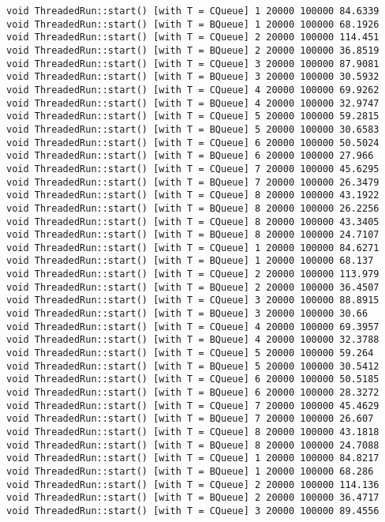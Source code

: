 \begin{verbatim}
void ThreadedRun::start() [with T = CQueue] 1 20000 100000 84.6339
void ThreadedRun::start() [with T = BQueue] 1 20000 100000 68.1926
void ThreadedRun::start() [with T = CQueue] 2 20000 100000 114.451
void ThreadedRun::start() [with T = BQueue] 2 20000 100000 36.8519
void ThreadedRun::start() [with T = CQueue] 3 20000 100000 87.9081
void ThreadedRun::start() [with T = BQueue] 3 20000 100000 30.5932
void ThreadedRun::start() [with T = CQueue] 4 20000 100000 69.9262
void ThreadedRun::start() [with T = BQueue] 4 20000 100000 32.9747
void ThreadedRun::start() [with T = CQueue] 5 20000 100000 59.2815
void ThreadedRun::start() [with T = BQueue] 5 20000 100000 30.6583
void ThreadedRun::start() [with T = CQueue] 6 20000 100000 50.5024
void ThreadedRun::start() [with T = BQueue] 6 20000 100000 27.966
void ThreadedRun::start() [with T = CQueue] 7 20000 100000 45.6295
void ThreadedRun::start() [with T = BQueue] 7 20000 100000 26.3479
void ThreadedRun::start() [with T = CQueue] 8 20000 100000 43.1922
void ThreadedRun::start() [with T = BQueue] 8 20000 100000 26.2256
void ThreadedRun::start() [with T = CQueue] 8 20000 100000 43.3405
void ThreadedRun::start() [with T = BQueue] 8 20000 100000 24.7107
void ThreadedRun::start() [with T = CQueue] 1 20000 100000 84.6271
void ThreadedRun::start() [with T = BQueue] 1 20000 100000 68.137
void ThreadedRun::start() [with T = CQueue] 2 20000 100000 113.979
void ThreadedRun::start() [with T = BQueue] 2 20000 100000 36.4507
void ThreadedRun::start() [with T = CQueue] 3 20000 100000 88.8915
void ThreadedRun::start() [with T = BQueue] 3 20000 100000 30.66
void ThreadedRun::start() [with T = CQueue] 4 20000 100000 69.3957
void ThreadedRun::start() [with T = BQueue] 4 20000 100000 32.3788
void ThreadedRun::start() [with T = CQueue] 5 20000 100000 59.264
void ThreadedRun::start() [with T = BQueue] 5 20000 100000 30.5412
void ThreadedRun::start() [with T = CQueue] 6 20000 100000 50.5185
void ThreadedRun::start() [with T = BQueue] 6 20000 100000 28.3272
void ThreadedRun::start() [with T = CQueue] 7 20000 100000 45.4629
void ThreadedRun::start() [with T = BQueue] 7 20000 100000 26.607
void ThreadedRun::start() [with T = CQueue] 8 20000 100000 43.1818
void ThreadedRun::start() [with T = BQueue] 8 20000 100000 24.7088
void ThreadedRun::start() [with T = CQueue] 1 20000 100000 84.8217
void ThreadedRun::start() [with T = BQueue] 1 20000 100000 68.286
void ThreadedRun::start() [with T = CQueue] 2 20000 100000 114.136
void ThreadedRun::start() [with T = BQueue] 2 20000 100000 36.4717
void ThreadedRun::start() [with T = CQueue] 3 20000 100000 89.4556

\end{verbatim}

